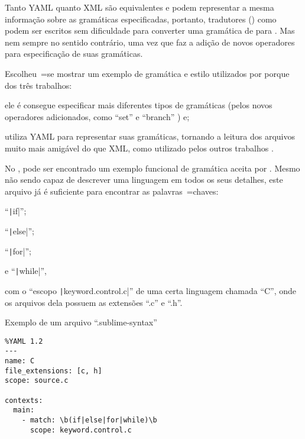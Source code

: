 Tanto YAML quanto XML são equivalentes e
podem representar a mesma informação sobre as gramáticas especificadas,
portanto,
tradutores () como  podem ser escritos sem dificuldade para converter uma gramática de  para .
Mas nem sempre no sentido contrário,
uma vez que  faz a adição de novos operadores para especificação de suas gramáticas.

Escolheu~=se mostrar um exemplo de gramática e
estilo utilizados por  porque dos três trabalhos:
\begin{inparaenum}[1)]
\item ele é consegue especificar mais diferentes tipos de gramáticas (pelos novos operadores adicionados,
como ``set'' e
``branch'' \cite{branchTemporarilyHighlightsWrong}) e;
\item utiliza YAML para representar suas gramáticas,
tornando a leitura dos arquivos muito mais amigável do que XML,
como utilizado pelos outros trabalhos \cite{textMateEditor,vsCodeSyntaxHighlighthing}.
\end{inparaenum}%
No ,
pode ser encontrado um exemplo funcional de gramática aceita por .
Mesmo não sendo capaz de descrever uma linguagem em todos os seus detalhes,
este arquivo já é suficiente para encontrar as palavras~=chaves:
\begin{inparaenum}[1)]
\item ``\texttt|if|'';
\item ``\texttt|else|'';
\item ``\texttt|for|'';
\item e
``\texttt|while|'',
\end{inparaenum}%
com o ``escopo \texttt|keyword.control.c|'' de uma certa linguagem chamada ``C'',
onde os arquivos dela possuem as extensões ``.c'' e
``.h''.
\begin{code}
\caption{Exemplo de um arquivo ``.sublime-syntax''}
\label{code:exemploDeUmArquivoSublimeSyntax}
\begin{verbatim}
%YAML 1.2
---
name: C
file_extensions: [c, h]
scope: source.c

contexts:
  main:
    - match: \b(if|else|for|while)\b
      scope: keyword.control.c
\end{verbatim}
\xpretocmd{\ABNTEXfontereduzida}{\setlength{\belowcaptionskip}{-13pt}}{}{}
\vspace{13pt}
\end{code}

